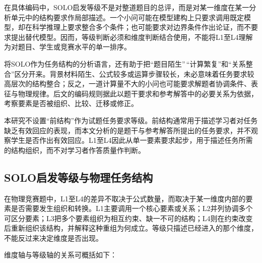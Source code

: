 \documentclass[
  12pt,
  a4paper,twoside,openany]{ctexbook}
\begin{document}
在具体编码中，SOLO启发等级不是对整道题目的总评，而是对某一维度在某一分析单元中的结构要求作局部描述。一个小问可能在模型建构上只要求调用既定模型，却在科学推理上要求整合多个条件；也可能要求对边界条件作出论证，而不要求提出替代模型。因而，等级判断必须和维度判断结合使用，不能将L1至L4理解为对题目、学生或竞赛水平的单一排序。

将SOLO作为任务结构的分析语言，还有助于把``题目陌生''\,``计算繁复''和``关系整合''区分开来。背景材料陌生、公式较多或运算步骤较长，未必意味着任务要求较高层次的结构整合；反之，一道计算量不大的小问也可能要求解题者协调条件、表征与物理规律。后文的编码规则据此以题干要求和参考解答中的必要关系为依据，考察要素是否被组织、比较、迁移或修正。

本研究不设置``前结构''作为试题任务要求等级。前结构通常用于描述学习者对任务缺乏有效回应的表现，而本文分析的是题干与参考解答所提出的任务要求，并不观察学生是否作出有效回应。L1至L4因此从单一要素要求起步，用于描述任务所需的结构组织，而不对学习者作答质量作判断。

\subsection{SOLO启发等级与物理任务结构}\label{soloux542fux53d1ux7b49ux7ea7ux4e0eux7269ux7406ux4efbux52a1ux7ed3ux6784}

在物理竞赛题中，L1至L4的差异不取决于公式数量，而取决于某一维度内部的要素是否需要发生组织和转换。L1主要调用一个核心要素或关系；L2并列协调多个可区分要素；L3把多个要素组织为相互约束、缺一不可的结构；L4则在约束改变后重新组织该结构，并解释这种重组为何成立。等级只描述已经进入的那个维度，不能反过来决定维度是否出现。

维度轴与等级轴的关系可概括如下：
\end{document}
